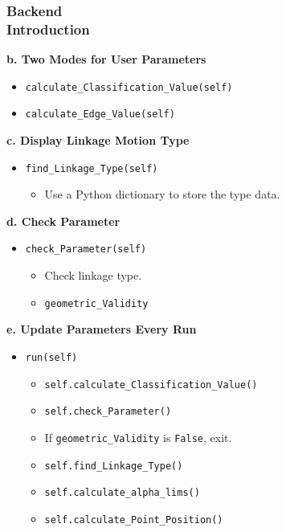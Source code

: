 \documentclass[ucs,10pt]{beamer}
\begin{document}
\begin{frame}
    \frametitle{Backend \\ \small \color{rwth-blue} Introduction}
    \textbf{b. Two Modes for User Parameters}
    \begin{itemize}
        \item \texttt{calculate\_Classification\_Value(self)}
        \item \texttt{calculate\_Edge\_Value(self)}
    \end{itemize}

    \textbf{c. Display Linkage Motion Type}
    \begin{itemize}
        \item \texttt{find\_Linkage\_Type(self)}
        \begin{itemize}
            \item Use a Python dictionary to store the type data.
        \end{itemize}
    \end{itemize}

    \textbf{d. Check Parameter}
    \begin{itemize}
        \item \texttt{check\_Parameter(self)}
        \begin{itemize}
            \item Check linkage type.
            \item \texttt{geometric\_Validity}
        \end{itemize}
    \end{itemize}

    \textbf{e. Update Parameters Every Run}
    \begin{itemize}
        \item \texttt{run(self)}
        \begin{itemize}
            \item \texttt{self.calculate\_Classification\_Value()}
            \item \texttt{self.check\_Parameter()}
            \item If \texttt{geometric\_Validity} is \texttt{False}, exit.
            \item \texttt{self.find\_Linkage\_Type()}
            \item \texttt{self.calculate\_alpha\_lims()}
            \item \texttt{self.calculate\_Point\_Position()}
        \end{itemize}
    \end{itemize}
\end{frame}
\end{document}

